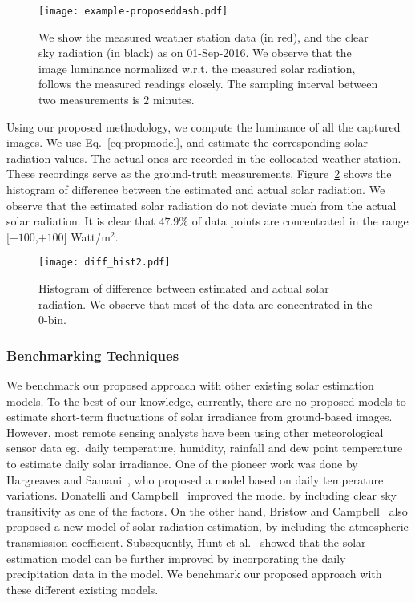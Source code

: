 \begin{figure}[htb]
\centering
\texttt{[image: example-proposeddash.pdf]}
\caption[Solar radiation and image luminance follows each other closely over the entire period of the day.]{We show the measured weather station data (in red), and the clear sky radiation (in black) as on 01-Sep-2016. We observe that the image luminance normalized w.r.t. the measured solar radiation, follows the measured readings closely. The sampling interval between two measurements is $2$ minutes.
\label{fig:tracksun}}
\end{figure}

Using our proposed methodology, we compute the luminance of all the captured images. We use Eq.~\ref{eq:propmodel}, and estimate the corresponding solar radiation values. The actual ones are recorded in the collocated weather station. These recordings serve as the ground-truth measurements. Figure~\ref{fig:HOD} shows the histogram of difference between the estimated and actual solar radiation. We observe that the estimated solar radiation do not deviate much from the actual solar radiation. It is clear that $47.9\%$ of data points are concentrated in the range [$-100$,$+100$] Watt/$\mbox{m}^2$.

\begin{figure}[htb]
\begin{center}
\texttt{[image: diff\_hist2.pdf]}
\caption{Histogram of difference between estimated and actual solar radiation. We observe that most of the data are concentrated in the $0$-bin. 
\label{fig:HOD}}
\end{center}
\end{figure}

\subsubsection{Benchmarking Techniques}
We benchmark our proposed approach with other existing solar estimation models. To the best of our knowledge, currently, there are no proposed models to estimate short-term fluctuations of solar irradiance from ground-based images. However, most remote sensing analysts have been using other meteorological sensor data eg.\ daily temperature, humidity, rainfall and dew point temperature to estimate daily solar irradiance. One of the pioneer work was done by Hargreaves and Samani~\cite{HSmodel}, who proposed a model based on daily temperature variations. Donatelli and Campbell~\cite{DCmodel} improved the model by including clear sky transitivity as one of the factors. On the other hand, Bristow and Campbell~\cite{BCmodel} also proposed a new model of solar radiation estimation, by including the atmospheric transmission coefficient. Subsequently, Hunt et al.~\cite{Huntmodel} showed that the solar estimation model can be further improved by incorporating the daily precipitation data in the model. We benchmark our proposed approach with these different existing models. 

